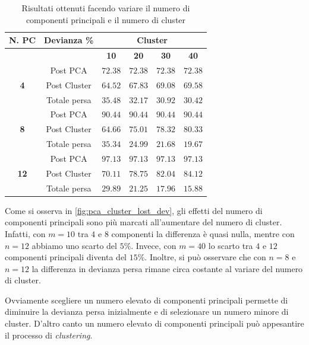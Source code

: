 \begin{table}[H]
\centering
    \begin{tabular}{|c|c|c|c|c|c|}
    \hline
    \multicolumn{1}{|c|}{\textbf{N. PC}} &
    \multicolumn{1}{|c|}{\textbf{Devianza \%}} &
    \multicolumn{4}{|c|}{\textbf{Cluster}} \tabularnewline \hline

 &  & \textbf{10} & \textbf{20} & \textbf{30}  & \textbf{40} \tabularnewline \hline
\multirow{3}{*}{\textbf{4}} & Post PCA & $72.38$ & $72.38$ & $72.38$ & $72.38$ \\[1.25ex]
& Post Cluster & $64.52$ & $67.83$ & $69.08$ & $69.58$ \\ [1.25ex]
& Totale persa & $35.48$ & $32.17$ & $30.92$ & $30.42$

\tabularnewline \hline

\multirow{3}{*}{\textbf{8}} & Post PCA & $90.44$ & $90.44$ & $90.44$ & $90.44$ \\ [1.25ex] 
& Post Cluster & $64.66$ & $75.01$ & $78.32$ & $80.33$ \\ [1.25ex]
& Totale persa & $35.34$ & $24.99$ & $21.68$ & $19.67$ 

\tabularnewline \hline

\multirow{3}{*}{\textbf{12}} & Post PCA & $97.13$ & $97.13$ & $97.13$ & $97.13$ \\ [1.25ex]
& Post Cluster & $70.11$ & $78.75$ & $82.04$ & $84.12$ \\ [1.25ex]
& Totale persa & $29.89$ & $21.25$ & $17.96$ & $15.88$

\tabularnewline \hline

\end{tabular}
\caption{Risultati ottenuti facendo variare il numero di componenti principali e il numero di cluster}

\label{tab:pca_cl_comp}
\end{table}

Come si osserva in \cref{fig:pca_cluster_lost_dev}, gli effetti del numero di componenti principali sono più marcati all'aumentare del numero di cluster. Infatti, con $m=10$ tra $4$ e $8$ componenti la differenza è quasi nulla, mentre con $n=12$ abbiamo uno scarto del $5 \%$. Invece, con $m=40$ lo scarto tra $4$ e $12$ componenti principali diventa del $15\%$. Inoltre, si può osservare che con $n=8$ e $n=12$ la differenza in devianza persa rimane circa costante al variare del numero di cluster.

Ovviamente scegliere un numero elevato di componenti principali permette di diminuire la devianza persa inizialmente e di selezionare un numero minore di cluster. D'altro canto un numero elevato di componenti principali può appesantire il processo di \textit{clustering}.

